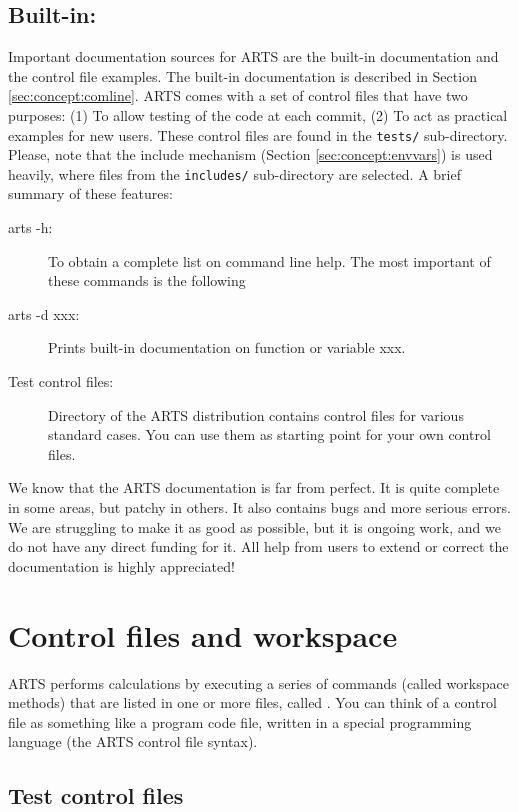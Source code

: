 \subsection{Built-in:}
Important documentation sources for ARTS are the built-in documentation
and the control file examples. The built-in documentation is described in
Section \ref{sec:concept:comline}. ARTS comes with a set of control
files that have two purposes: (1) To allow testing of the code at each
commit, (2) To act as practical examples for new users. These control
files are found in the \verb|tests/| sub-directory. Please, note that the
include mechanism (Section \ref{sec:concept:envvars}) is used heavily,
where files from the \verb|includes/| sub-directory are selected.
A brief summary of these features:
\begin{description}
\item[arts -h:] To obtain a complete list on command line help. The most
  important of these commands is the following
\item[arts -d xxx:] Prints built-in documentation on function or
  variable xxx. 
\item[Test control files:] Directory  of the ARTS distribution
  contains control files for various standard cases. You can use them
  as starting point for your own control files. 
\end{description}

\noindent
We know that the ARTS documentation is far from perfect. It is quite
complete in some areas, but patchy in others. It also contains bugs
and more serious errors. We are struggling to make it as good as
possible, but it is ongoing work, and we do not have any direct
funding for it. All help from users to extend or correct the
documentation is highly appreciated!


\section{Control files and workspace}

ARTS performs calculations by executing a series of commands (called
workspace methods) that are listed in one or more files, called
. You can think of a control file as something like a
program code file, written in a special programming language (the ARTS
control file syntax).

\subsection{Test control files}


